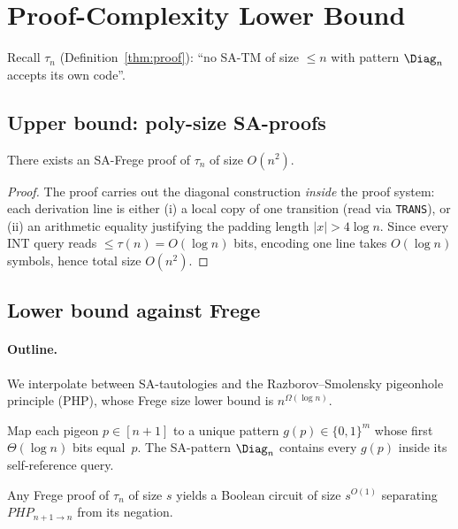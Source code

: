 \section{Proof-Complexity Lower Bound}

Recall $\tau_n$
(Definition~\ref{thm:proof}):  
“no SA-TM of size $\le n$ with pattern $\Diag_n$
accepts its own code”.

\subsection{Upper bound: poly-size SA-proofs}

\begin{lemma}\label{lem:sa-proof}
There exists an SA-Frege proof of $\tau_n$
of size $O(n^2)$.
\end{lemma}

\begin{proof}
The proof carries out the diagonal construction
\emph{inside} the proof system:
each derivation line is either
(i) a local copy of one transition
(read via \texttt{TRANS}), or
(ii) an arithmetic equality justifying the
padding length $|x|>4\log n$.
Since every INT query reads $\le\tau(n)=O(\log n)$ bits,
encoding one line takes $O(\log n)$ symbols,
hence total size $O(n^2)$.
\end{proof}

\subsection{Lower bound against Frege}

\paragraph{Outline.}
We interpolate between SA-tautologies and
the Razborov–Smolensky pigeonhole principle (PHP),
whose Frege size lower bound is $n^{\Omega(\log n)}$.

\begin{definition}\label{def:gadget}
Map each pigeon $p\in[n+1]$ to a unique
pattern $g(p)\in\{0,1\}^{m}$ 
whose first $\Theta(\log n)$ bits equal~$p$.
The SA-pattern $\Diag_n$ contains every $g(p)$
inside its self-reference query.
\end{definition}

\begin{lemma}\label{lem:interpolation}
Any Frege proof of $\tau_n$ of size $s$
yields a Boolean circuit of size $s^{O(1)}$
separating
\(\textit{PHP}_{n+1\to n}\) from its negation.
\end{lemma}

